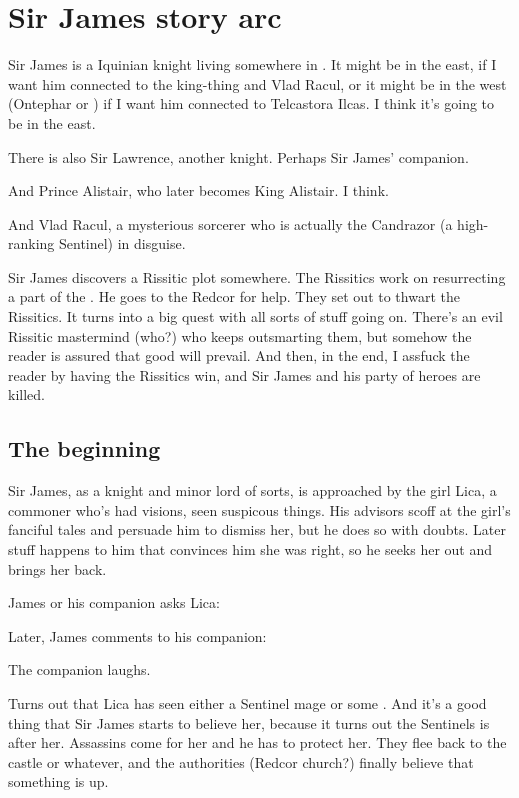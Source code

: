 \section{Sir James story arc}
Sir James is a \human{} Iquinian knight living somewhere in \Velcad{}. 
It might be in the east, if I want him connected to the king-thing and Vlad Racul, or it might be in the west (Ontephar or \Scyrum) if I want him connected to Telcastora Ilcas. 
I think it's going to be in the east. 

There is also Sir Lawrence, another knight. 
Perhaps Sir James' companion. 

And Prince Alistair, who later becomes King Alistair. 
I think. 

And Vlad Racul, a mysterious sorcerer who is actually the \dragon{} Candrazor (a high-ranking Sentinel) in disguise. 

Sir James discovers a Rissitic plot somewhere. 
The Rissitics work on resurrecting a part of the \Haskelek{} \daemon. 
He goes to the Redcor for help. They set out to thwart the Rissitics. 
It turns into a big quest with all sorts of stuff going on. 
There's an evil Rissitic mastermind (who?) who keeps outsmarting them, but somehow the reader is assured that good will prevail. 
And then, in the end, I assfuck the reader by having the Rissitics win, and Sir James and his party of heroes are killed. 




\subsection{The beginning}
Sir James, as a knight and minor lord of sorts, is approached by the girl Lica, a commoner who's had visions, seen suspicous things. 
His advisors scoff at the girl's fanciful tales and persuade him to dismiss her, but he does so with doubts. 
Later stuff happens to him that convinces him she was right, so he seeks her out and brings her back. 

James or his companion asks Lica: 


Later, James comments to his companion: 

The companion laughs. 

Turns out that Lica has seen either a Sentinel mage or some \daemon. 
And it's a good thing that Sir James starts to believe her, because it turns out the Sentinels is after her. Assassins come for her and he has to protect her. They flee back to the castle or whatever, and the authorities (Redcor church?) finally believe that something is up. 

